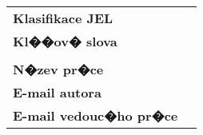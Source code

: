 \bigskip

\begin{tabular}{lp{7.7cm}}
		\textbf{Klasifikace JEL} & \JEL \\
		\textbf{Kl��ov� slova} & \Klic \\
 		& \\
		\textbf{N�zev pr�ce} & \BooknameCZ \\
 		\textbf{E-mail autora} & \texttt{\href{mailto:\Email}{\Email}}\\
		\textbf{E-mail vedouc�ho pr�ce} & \texttt{\href{mailto:\EmailSup}{\EmailSup}}\\
\end{tabular}

